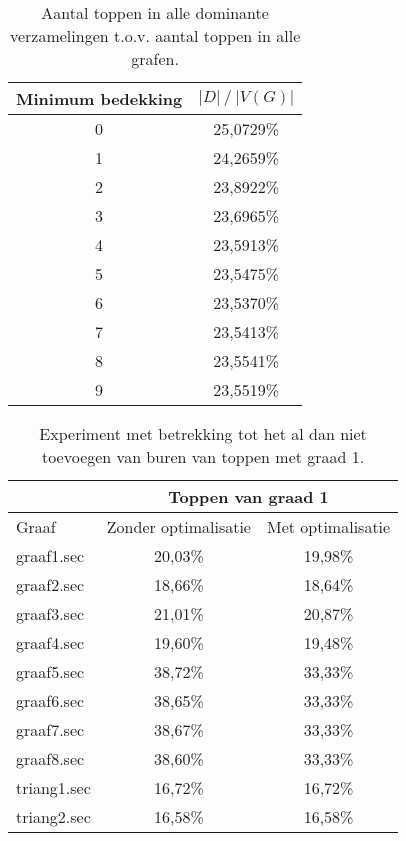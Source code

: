 \documentclass[11pt, a4paper, table]{article}
\theoremstyle{definition}
\theoremstyle{definition}
\theoremstyle{definition}
\begin{document}
\begin{table}
	\centering
	\begin{tabular}{|c|c|}
		\hline
		Minimum bedekking & $|D|\ /\ |V(G)|$		\\ \hline
		0 & 25,0729\% \\ \hline
		1 & 24,2659\% \\ \hline
		2 & 23,8922\% \\ \hline
		3 & 23,6965\% \\ \hline
		4 & 23,5913\% \\ \hline
		5 & 23,5475\% \\ \hline
		6 &\cellcolor{LimeGreen} 23,5370\% \\ \hline
		7 & 23,5413\% \\ \hline
		8 & 23,5541\% \\ \hline
		9 & 23,5519\% \\ \hline
	\end{tabular}
	\caption{Aantal toppen in alle dominante verzamelingen t.o.v. aantal toppen in alle grafen.}
	\label{tabel:bedekking3}
\end{table}

\begin{table}
	\centering
	\begin{tabular}{|l|c|c|}
		\hline
		& \multicolumn{2}{c|}{Toppen van graad 1}		\\ \hline
		Graaf & Zonder optimalisatie  & Met optimalisatie 		\\ \hline
		graaf1.sec & 20,03\% &  \cellcolor{LimeGreen}19,98\%		\\ \hline
		graaf2.sec & 18,66\% &  \cellcolor{LimeGreen}18,64\%		\\ \hline
		graaf3.sec & 21,01\% &  \cellcolor{LimeGreen}20,87\%		\\ \hline
		graaf4.sec & 19,60\% &  \cellcolor{LimeGreen}19,48\%		\\ \hline
		graaf5.sec & 38,72\% &  \cellcolor{LimeGreen}33,33\%		\\ \hline
		graaf6.sec & 38,65\% &  \cellcolor{LimeGreen}33,33\%		\\ \hline
		graaf7.sec & 38,67\% &  \cellcolor{LimeGreen}33,33\%		\\ \hline
		graaf8.sec & 38,60\% &  \cellcolor{LimeGreen}33,33\%		\\ \hline
		triang1.sec &  \cellcolor{LimeGreen}16,72\% & 16,72\%		\\ \hline
		triang2.sec &  \cellcolor{LimeGreen}16,58\% & 16,58\%		\\ \hline
	\end{tabular}
	\caption{Experiment met betrekking tot het al dan niet toevoegen van buren van toppen met graad 1.}
	\label{table:oneneighbour}
\end{table}
\end{document}
